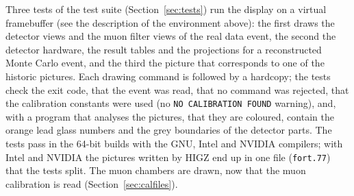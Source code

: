 Three tests of the test suite (Section~\ref{sec:tests}) run the display on a virtual framebuffer (see the description of the environment
above): the first draws the detector views and the muon filter views of the real data
event, the second the detector hardware, the result tables and the projections for a reconstructed
Monte Carlo event, and the third the picture that corresponds to one of the historic pictures.
Each drawing command is followed by a hardcopy; the tests check the exit code, that the event was read, that no
command was rejected, that the calibration constants were used (no \texttt{NO CALIBRATION FOUND} warning),
and, with a program that analyses the pictures, that they are coloured, contain the orange lead glass numbers
and the grey boundaries of the detector parts. The tests pass in the 64-bit builds with the GNU, Intel and
NVIDIA compilers; with Intel and NVIDIA the pictures written by HIGZ end up in one file (\texttt{fort.77}) that
the tests split. The muon chambers are drawn, now that the muon calibration is read (Section~\ref{sec:calfiles}).

